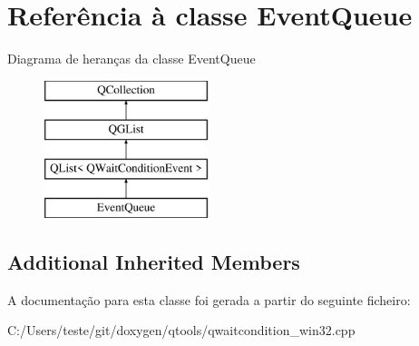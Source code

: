 \hypertarget{class_event_queue}{\section{Referência à classe Event\-Queue}
\label{class_event_queue}
}
Diagrama de heranças da classe Event\-Queue\begin{figure}[H]
\begin{center}
\leavevmode
\includegraphics[height=4.000000cm]{class_event_queue}
\end{center}
\end{figure}
\subsection*{Additional Inherited Members}


A documentação para esta classe foi gerada a partir do seguinte ficheiro\-:\begin{DoxyCompactItemize}
\item 
C\-:/\-Users/teste/git/doxygen/qtools/qwaitcondition\-\_\-win32.\-cpp\end{DoxyCompactItemize}
